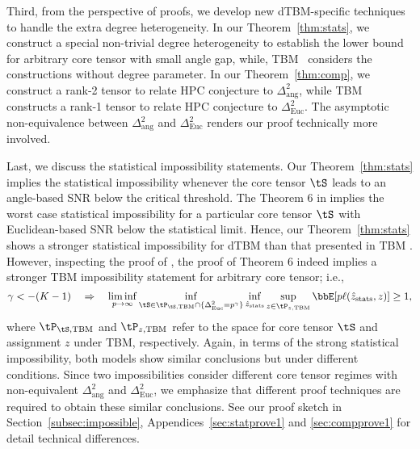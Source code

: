\documentclass[lettersize,onecolumn,journal]{IEEEtran}
\theoremstyle{definition}
\theoremstyle{definition}
\begin{document}
{\begin{itemize}[wide]
 {
 \color{blue}
 
Third, from the perspective of proofs, we develop new dTBM-specific techniques to handle the extra degree heterogeneity. In our Theorem~\ref{thm:stats}, we construct a special non-trivial degree heterogeneity to establish the lower bound for arbitrary core tensor with small angle gap, while, TBM~\citep{han2020exact} considers the constructions without degree parameter.
In our Theorem~\ref{thm:comp}, we construct a rank-2 tensor to relate HPC conjecture to $\Delta^2_{\text{ang}}$, while TBM~\citep{han2020exact} constructs a rank-1 tensor to relate HPC conjecture to $\Delta^2_{\text{Euc}}$. The asymptotic non-equivalence between $\Delta^2_{\text{ang}}$ and $\Delta^2_{\text{Euc}}$ renders our proof technically more involved.
 
 Last, we discuss the statistical impossibility statements. Our Theorem~\ref{thm:stats} implies the statistical impossibility whenever the core tensor $\tS$ leads to an angle-based SNR below the critical threshold. The Theorem 6 in \cite{han2020exact} implies the worst case statistical impossibility for a particular core tensor $\tS$ with Euclidean-based SNR below the statistical limit. Hence, our Theorem~\ref{thm:stats} shows a stronger statistical impossibility for dTBM than that presented in TBM \citet[Theorem 6]{han2020exact}. However, inspecting the proof of \cite{han2020exact}, the proof of Theorem 6 indeed implies a stronger TBM impossibility statement for arbitrary core tensor; i.e.,
 \begin{equation}
     \gamma < -(K-1) \quad \Rightarrow \quad \liminf_{p \rightarrow \infty} \inf_{ \tS \in \tP_{\tS, {\rm TBM}} \cap \{\Delta_{\rm Euc}^2 = p^{\gamma} \} }\inf_{\hat z_{\rm stats}}  \sup_{z \in \tP_{z, {\rm TBM}}}  \bbE[p \ell(\hat z_{\rm stats}, z)] \geq 1,
 \end{equation}
 where $\tP_{\tS, {\rm TBM}}$ and $\tP_{z, {\rm TBM}}$ refer to the space for core tensor $\tS$ and assignment $z$ under TBM, respectively. Again, in terms of the strong statistical impossibility, both models show similar conclusions but under different conditions. Since two impossibilities consider different core tensor regimes with non-equivalent $\Delta^2_{\text{ang}}$ and $\Delta^2_{\text{Euc}}$, we emphasize that different proof techniques are required to obtain these similar conclusions. See our proof sketch in Section~\ref{subsec:impossible}, Appendices~\ref{sec:statprove1} and \ref{sec:compprove1} for detail technical differences.

}
\end{itemize}}
\end{document}
